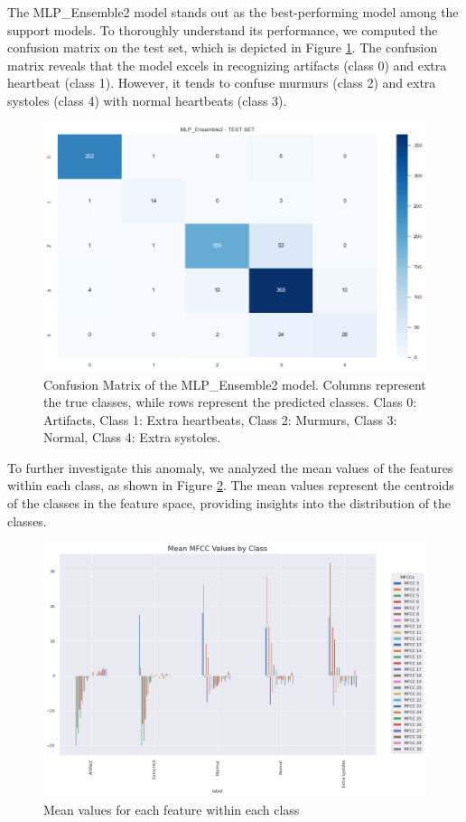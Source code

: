 The MLP\_Ensemble2 model stands out as the best-performing model among the support models.
To thoroughly understand its performance, we computed the confusion matrix on the test set, which is depicted in Figure \ref{fig:support_models_conf_matrix}.
The confusion matrix reveals that the model excels in recognizing artifacts (class 0) and extra heartbeat (class 1).
However, it tends to confuse murmurs (class 2) and extra systoles (class 4) with normal heartbeats (class 3).
\begin{figure}[h]
    \centering
    \includegraphics[width=\columnwidth]{../images/support_models_conf_matrix.png}
    \caption{Confusion Matrix of the MLP\_Ensemble2 model. Columns represent the true classes, while rows represent the predicted classes. Class 0: Artifacts, Class 1: Extra heartbeats, Class 2: Murmurs, Class 3: Normal, Class 4: Extra systoles.}
    \label{fig:support_models_conf_matrix}
\end{figure}
\noindent
To further investigate this anomaly, we analyzed the mean values of the features within each class, as shown in Figure \ref{fig:mean_val_for_features}.
The mean values represent the centroids of the classes in the feature space, providing insights into the distribution of the classes.
\begin{figure}[h]
    \centering
    \includegraphics[width=\columnwidth]{../images/mean_val_for_features.png}
    \caption{Mean values for each feature within each class}
    \label{fig:mean_val_for_features}
\end{figure}
